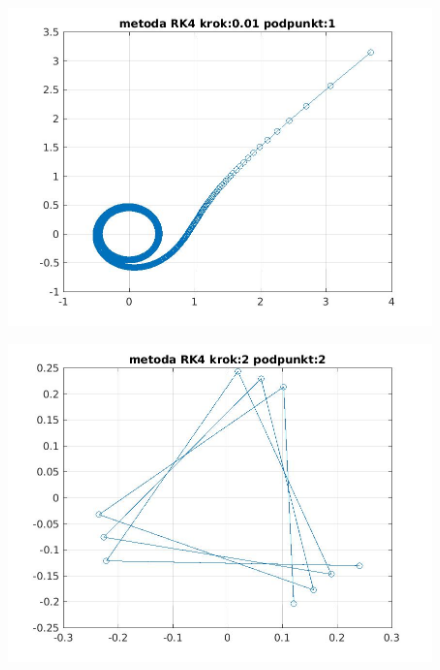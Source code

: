 \documentclass[a4paper, 12pt]{article}
\begin{document}
\begin{figure}[H]
\centering
\includegraphics[width = 15cm]{2d/metoda RK4 krok:0,01 podpunkt:1.jpg}
\end{figure}

\begin{figure}[H]
\centering
\includegraphics[width = 15cm]{2d/metoda RK4 krok:2 podpunkt:2.jpg}
\end{figure}
\end{document}
